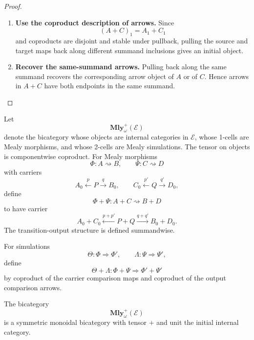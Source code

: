 \begin{proof}
\begin{enumerate}
  \item \textbf{Use the coproduct description of arrows.}
  Since
  \[
    (A+C)_1=A_1+C_1
  \]
  and coproducts are disjoint and stable under pullback, pulling the source
  and target maps back along different summand inclusions gives an initial
  object.

  \item \textbf{Recover the same-summand arrows.}
  Pulling back along the same summand recovers the corresponding arrow object
  of \(A\) or of \(C\). Hence arrows in \(A+C\) have both endpoints in the
  same summand.
\end{enumerate}
\end{proof}

Let
\[
  \mathbf{Mly}^{+}_{\omega}(\mathcal E)
\]
denote the bicategory whose objects are internal categories in \(\mathcal E\),
whose 1-cells are Mealy morphisms, and whose 2-cells are Mealy simulations.
The tensor on objects is componentwise coproduct. For Mealy morphisms
\[
  \Phi:A\rightsquigarrow B,
  \qquad
  \Psi:C\rightsquigarrow D
\]
with carriers
\[
  A_0\xleftarrow{p}P\xrightarrow{q}B_0,
  \qquad
  C_0\xleftarrow{p'}Q\xrightarrow{q'}D_0,
\]
define
\[
  \Phi+\Psi:A+C\rightsquigarrow B+D
\]
to have carrier
\[
  A_0+C_0
  \xleftarrow{p+p'}
  P+Q
  \xrightarrow{q+q'}
  B_0+D_0.
\]
The transition-output structure is defined summandwise.

For simulations
\[
  \Theta:\Phi\Rightarrow\Phi',
  \qquad
  \Lambda:\Psi\Rightarrow\Psi',
\]
define
\[
  \Theta+\Lambda:\Phi+\Psi\Rightarrow\Phi'+\Psi'
\]
by coproduct of the carrier comparison maps and coproduct of the output
comparison arrows.

\begin{theorem}
\label{thm:coproduct-symmetric-monoidal-bicategory-mealy}
The bicategory
\[
  \mathbf{Mly}^{+}_{\omega}(\mathcal E)
\]
is a symmetric monoidal bicategory with tensor \(+\) and unit the initial
internal category.
\end{theorem}

